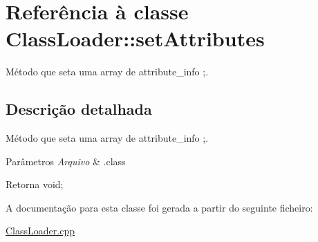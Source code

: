\hypertarget{class_class_loader_1_1set_attributes}{}\section{Referência à classe Class\+Loader\+:\+:set\+Attributes}
\label{class_class_loader_1_1set_attributes}


Método que seta uma array de attribute\+\_\+info ;.  




\subsection{Descrição detalhada}
Método que seta uma array de attribute\+\_\+info ;. 


\begin{DoxyParams}{Parâmetros}
{\em Arquivo} & .class \\
\hline
\end{DoxyParams}
\begin{DoxyReturn}{Retorna}
void; 
\end{DoxyReturn}


A documentação para esta classe foi gerada a partir do seguinte ficheiro\+:\begin{DoxyCompactItemize}
\item 
\hyperlink{_class_loader_8cpp}{Class\+Loader.\+cpp}\end{DoxyCompactItemize}

